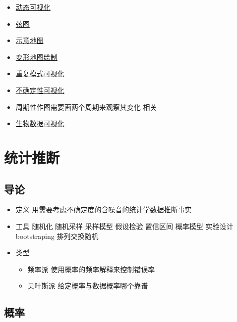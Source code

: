 \documentclass[
]{book}
\providecommand{\tightlist}{%
  \setlength{\itemsep}{0pt}\setlength{\parskip}{0pt}}
\begin{document}
\begin{itemize}
\tightlist
\item
  \href{https://github.com/thomasp85/tweenr}{动态可视化}
\item
  \href{https://github.com/jokergoo/circlize}{弦图}
\item
  \href{https://github.com/hafen/geofacet}{示意地图}
\item
  \href{https://github.com/sjewo/cartogram}{变形地图绘制}
\item
  \href{https://flowingdata.com/2018/07/09/how-to-visualize-recurring-patterns/}{重复模式可视化}
\item
  \href{https://flowingdata.com/2018/01/08/visualizing-the-uncertainty-in-data/}{不确定性可视化}
\item
  周期性作图需要画两个周期来观察其变化 相关
\item
  \href{https://www.nature.com/articles/nbt.1567}{生物数据可视化}
\end{itemize}

\hypertarget{infer}{%
\chapter{统计推断}\label{infer}}

\hypertarget{ux5bfcux8bba}{%
\section{导论}\label{ux5bfcux8bba}}

\begin{itemize}
\tightlist
\item
  定义 用需要考虑不确定度的含噪音的统计学数据推断事实
\item
  工具 随机化 随机采样 采样模型 假设检验 置信区间 概率模型 实验设计 bootstraping 排列交换随机
\item
  类型

  \begin{itemize}
  \tightlist
  \item
    频率派 使用概率的频率解释来控制错误率
  \item
    贝叶斯派 给定概率与数据概率哪个靠谱
  \end{itemize}
\end{itemize}

\hypertarget{ux6982ux7387}{%
\section{概率}\label{ux6982ux7387}}
\end{document}
